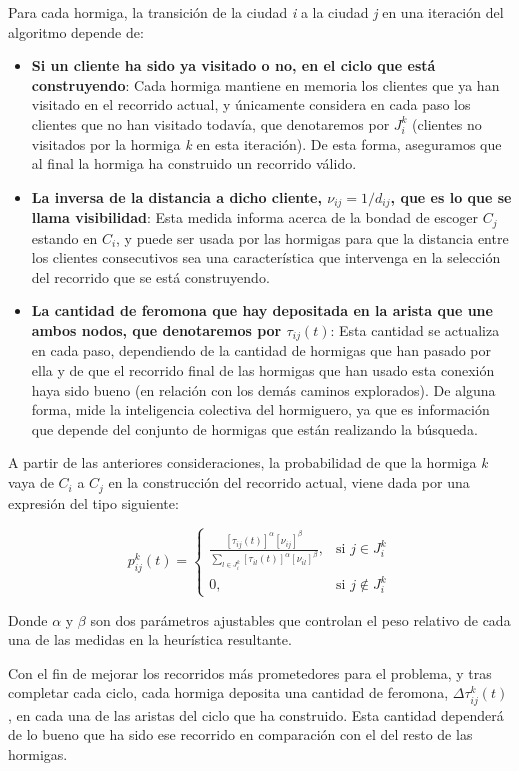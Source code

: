 \documentclass[twocolumn, fontsize=10pt]{article}
\begin{document}
Para cada hormiga, la transición de la ciudad \textit{i} a la ciudad \textit{j} en una iteración del algoritmo depende de:
\begin{itemize}
    \item \textbf{Si un cliente ha sido ya visitado o no, en el ciclo que está construyendo}: Cada hormiga mantiene en memoria los clientes que ya han visitado en el recorrido actual, y únicamente considera en cada paso los clientes que no han visitado todavía, que denotaremos por $J_i^k$ (clientes no visitados por la hormiga \textit{k} en esta iteración). De esta forma, aseguramos que al final la hormiga ha 
    construido un recorrido válido.
    \item \textbf{La inversa de la distancia a dicho cliente, \(\nu_{ij} = 1/d_{ij}\), que es lo que se llama visibilidad}: Esta medida informa acerca de la bondad de escoger \( C_j \) estando en \( C_i \), y puede ser usada por las hormigas para que la distancia entre los clientes consecutivos sea una característica que intervenga en la selección del recorrido que se está construyendo.
    \item \textbf{La cantidad de feromona que hay depositada en la arista que une ambos nodos, que denotaremos por \(\tau_{ij}(t)\)}: Esta cantidad se actualiza en cada paso, dependiendo de la cantidad de hormigas que han pasado por ella y de que el recorrido final de las hormigas que han usado esta conexión haya sido bueno (en relación con los demás caminos explorados). De alguna forma, mide la inteligencia colectiva del hormiguero, ya que es información que depende del conjunto de hormigas que están realizando la búsqueda.
\end{itemize}

A partir de las anteriores consideraciones, la probabilidad de que la hormiga \textit{k} vaya de \(C_i\) a \(C_j\) en la construcción del recorrido actual, viene dada por una expresión del tipo siguiente:

\[
p_{ij}^k(t) =
\begin{cases}
\frac{[\tau_{ij}(t)]^\alpha [\nu_{ij}]^\beta}{\sum\limits_{l \in J_i^k} [\tau_{il}(t)]^\alpha [\nu_{il}]^\beta}, & \text{si } j \in J_i^k \\[10pt]
0, & \text{si } j \notin J_i^k
\end{cases}
\]

Donde \(\alpha\) y \(\beta\) son dos parámetros ajustables que controlan el peso relativo de cada una de las medidas en la heurística resultante.

Con el fin de mejorar los recorridos más prometedores para el problema, y tras completar cada ciclo, cada hormiga deposita una cantidad de feromona, \(\Delta \tau_{ij}^k(t)\), en cada una de las aristas del ciclo que ha construido. Esta cantidad dependerá de lo bueno que ha sido ese recorrido en comparación con el del resto de las hormigas.
\end{document}
